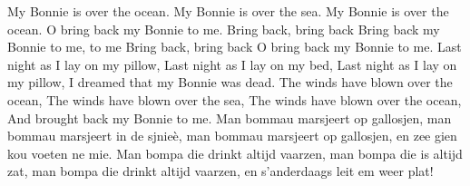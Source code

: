 \beginverse*
My Bonnie is over the ocean.
My Bonnie is over the sea.
My Bonnie is over the ocean.
O bring back my Bonnie to me.
\endverse
\beginchorus
Bring back, bring back
Bring back my Bonnie to me, to me
Bring back, bring back
O bring back my Bonnie to me.
\endchorus
\beginverse*
Last night as I lay on my pillow,
Last night as I lay on my bed,
Last night as I lay on my pillow,
I dreamed that my Bonnie was dead.
\endverse
\beginverse*
The winds have blown over the ocean,
The winds have blown over the sea,
The winds have blown over the ocean,
And brought back my Bonnie to me.
\endverse
\beginverse*
Man bommau marsjeert op gallosjen,
man bommau marsjeert in de sjnieè,
man  bommau marsjeert op gallosjen,
en zee gien kou voeten ne mie.
\endverse
\beginverse*
Man bompa die drinkt altijd vaarzen,
man bompa die is altijd zat, 
man bompa die drinkt altijd vaarzen,
en s’anderdaags leit em weer plat!
\endverse
\endsong 